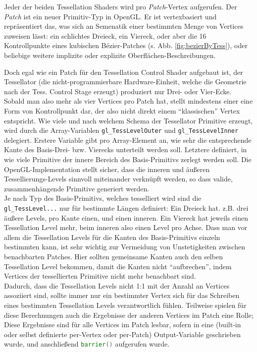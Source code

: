 	Jeder der beiden Tessellation Shaders wird pro \emph{Patch}-Vertex aufgerufen. Der \emph{Patch}
	ist ein neuer Primitiv-Typ in OpenGL. Er ist vertexbasiert und repräsentiert das, was sich
	an Semenatik einer bestimmten Menge von Vertices zuweisen lässt: ein schlichtes Dreieck, ein Viereck,
	oder aber die 16 Kontrollpunkte eines kubischen Bézier-Patches (s. Abb. \ref{fig:bezierByTess}), oder beliebige 
	weitere implizite oder explizite Oberflächen-Beschreibungen.

	
	Doch egal wie ein Patch für den Tessellation Control Shader aufgebaut ist, der Tessellator
	(die nicht-programmierbare Hardware-Einheit, welche die Geometrie nach der Tess. Control Stage
	erzeugt) produziert nur Drei- oder Vier-Ecke. Sobald man also mehr als vier Vertices pro Patch hat,
	stellt mindestens einer eine Form von Kontrollpunkt dar, der also nicht direkt einem "`klassischen"'
	Vertex entspricht.
	Wie viele und nach welchem Schema der Tessellator Primitive erzeugt, wird durch die
	Array-Variablen \lstinline|gl_TessLevelOuter| und \lstinline|gl_TessLevelInner| delegiert.
	Erstere Variable gibt pro Array-Element an, wie sehr die entsprechende Kante des Basis-Drei- bzw.
	Vierecks unterteilt werden soll. Letztere definiert, in wie viele Primitive der innere Bereich des
	Basis-Primitivs zerlegt werden soll. Die OpenGL-Implementation stellt sicher, dass die inneren und äußeren
	Tessellierungs-Levels sinnvoll miteinander verknüpft werden, so dass valide, zusammenhängende
	Primitive generiert werden. \\
	Je nach Typ des Basis-Primitivs, welches tesselliert wird sind die \lstinline|gl_TessLevel...|
	nur für bestimmte Längen definiert: Ein Dreieck hat. z.B. drei äußere Levels, pro Kante einen,
	und einen inneren. Ein Viereck hat jeweils einen Tessellation Level mehr, beim inneren also einen Level pro Achse.
	Dass man vor allem die Tessellation Levels für die Kanten des Basis-Primitivs einzeln bestimmten kann,
	ist sehr wichtig zur Vermeidung von  Unstetigkeiten zwischen benachbarten Patches. Hier sollten gemeinsame Kanten
	auch den selben Tessellation Level bekommen, damit die Kanten nicht "`aufbrechen"', indem Vertices der tessellierten
	Primitive nicht mehr benachbart sind.\\
	Dadurch, dass die Tessellation Levels nicht 1:1 mit der Anzahl an Vertices assoziiert sind, sollte immer nur
	ein bestimmter Vertex sich für das Schreiben eines bestimmten Tessellation Levels verantwortlich fühlen.
	Teilweise spielen für diese Berechnungen auch die Ergebnisse der anderen Vertices im Patch eine Rolle;
	Diese Ergebnisse sind für alle Vertices im Patch lesbar, sofern in eine (built-in oder selbst definierte
	per-Vertex oder per-Patch)	Output-Variable geschrieben wurde, und anschließend 
	\lstinline[language=GLSL]|barrier()| aufgerufen wurde.
	
